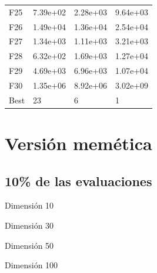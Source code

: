 \begin{table}[H]
\begin{minipage}{.5\linewidth}
\begin{tabular}{llll}
        F25  &  7.39e+02 &   2.28e+03 &  9.64e+03 \\
        F26  &  1.49e+04 &   1.36e+04 &  2.54e+04 \\
        F27  &  1.34e+03 &   1.11e+03 &  3.21e+03 \\
        F28  &  6.32e+02 &   1.69e+03 &  1.27e+04 \\
        F29  &  4.69e+03 &   6.96e+03 &  1.07e+04 \\
        F30  &  1.35e+06 &   8.92e+06 &  3.02e+09 \\
        Best &        23 &          6 &         1 \\
        \bottomrule
        \end{tabular}
        
    \end{minipage} 
\end{table}





\newpage
\section{Versión memética}

\subsection*{10\% de las evaluaciones}

\begin{table}[H]
    \begin{minipage}{.5\linewidth}
      \caption{Dimensión 10}
      \centering
        
    \end{minipage}%
    \begin{minipage}{.5\linewidth}
      \centering
        \caption{Dimensión 30}

    \end{minipage} 
\end{table}

\begin{table}[H]
    \begin{minipage}{.5\linewidth}
      \caption{Dimensión 50}
      \centering
        
    \end{minipage}%
    \begin{minipage}{.5\linewidth}
      \centering
      \caption{Dimensión 100}
         
    \end{minipage} 
\end{table}


